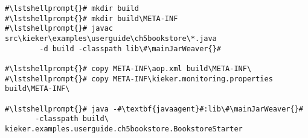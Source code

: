 \begin{lstlisting}[caption=Commands to compile and run the annotated Bookstore under Windows, label=lst:traceAnalysisCompileRunExample1Win]
#\lstshellprompt{}# mkdir build
#\lstshellprompt{}# mkdir build\META-INF
#\lstshellprompt{}# javac src\kieker\examples\userguide\ch5bookstore\*.java
        -d build -classpath lib\#\mainJarWeaver{}#

#\lstshellprompt{}# copy META-INF\aop.xml build\META-INF\
#\lstshellprompt{}# copy META-INF\kieker.monitoring.properties build\META-INF\

#\lstshellprompt{}# java -#\textbf{javaagent}#:lib\#\mainJarWeaver{}#
       -classpath build\ kieker.examples.userguide.ch5bookstore.BookstoreStarter
\end{lstlisting}
